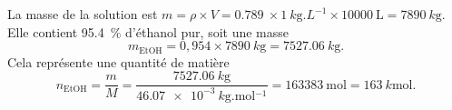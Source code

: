 \reponse{\reponseA{}}

\begin{corrige}
La masse de la solution est $m=\rho\times V=\SI{0,789}{}\times\SI{1}{k\gram.L^{-1}}\times\SI{10000}{\liter}=\SI{7890}{k\gram}$. Elle contient \SI{95,4}{\percent} d'éthanol pur, soit une masse 
\[
m_{\textrm{Et}\textrm{O}\textrm{H}}=0,954\times\SI{7890}{k\gram}=\SI{7527,06}{k\gram}.
\]
Cela représente une quantité de matière 
\[
n_{\textrm{Et}\textrm{O}\textrm{H}}=\frac{m}{M}=\frac{\SI{7527,06}{k\gram}}{\SI{46,07e-3}{k\gram.\mol^{-1}}}=\SI{163383}{\mole}=\SI{163}{k\mole}.
\]
\end{corrige}

\finEntrainement






\afficheReponsesMelangees

\finFicheEntrainement                                                                        %




\ifdefined\mainIsLoaded\else
\printReponsesEtCorriges
\fi
